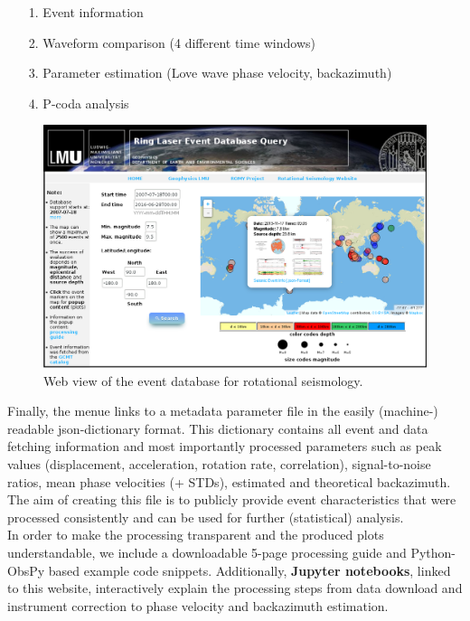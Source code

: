 \documentclass[12pt,reqno,letter]{article} %
\begin{document}
\begin{itemize}
	\item[1.] Event information
	\item[2.] Waveform comparison (4 different time windows)
	\item[3.] Parameter estimation (Love wave phase velocity, backazimuth)
	\item[4.] P-coda analysis
\end{itemize}
\begin{figure}[!htp]
\centering
\includegraphics[width=\textwidth]{webpage_framed.png}
\caption{Web view of the event database for rotational seismology.}
\label{fig:website}
\end{figure}
\noindent
Finally, the menue links to a metadata parameter file in the easily (machine-) readable json-dictionary format. This dictionary contains all event and data fetching information and most importantly processed parameters such as  peak values (displacement, acceleration, rotation rate, correlation), signal-to-noise ratios, mean phase velocities (+ STDs), estimated and theoretical backazimuth.
The aim of creating this file is to publicly provide event characteristics that were processed consistently and can be used for further (statistical) analysis.\\
In order to make the processing transparent and the produced plots understandable, we include a downloadable 5-page processing guide  and Python-ObsPy based example code snippets. Additionally, \textbf{Jupyter notebooks}, linked to this website, interactively explain the processing steps from data download and instrument correction to phase velocity and backazimuth estimation.
%
%
\end{document}
